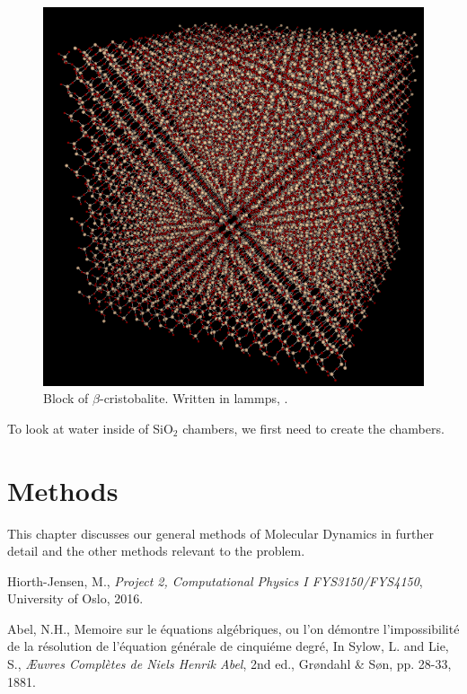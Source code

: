 \documentclass[10pt, a4paper]{report}
\begin{document}
\begin{figure}[h] 

 \includegraphics[scale=0.35]{block}\centering
 \caption{\label{fig:pores}Block of $\beta$-cristobalite. Written in lammps, .}
 
\end{figure}


To look at water inside of SiO$_2$ chambers, we first need to create the chambers.



\chapter{Methods}

This chapter discusses our general methods of Molecular Dynamics in further detail and the other methods relevant to the problem.


\begin{thebibliography}{9}

	Hiorth-Jensen, M.,
	\emph{Project 2, Computational Physics I FYS3150/FYS4150},
	University of Oslo,
	2016.
	
	Abel, N.H.,
	Memoire sur le équations algébriques, ou l'on démontre l'impossibilité de la résolution de l'équation générale de cinquiéme degré,
	In Sylow, L. and Lie, S., 
	\emph{Æuvres Complètes de Niels Henrik Abel}, 2nd ed.,
	Grøndahl \& Søn, pp. 28-33,
	1881.

\end{thebibliography}
\end{document}
